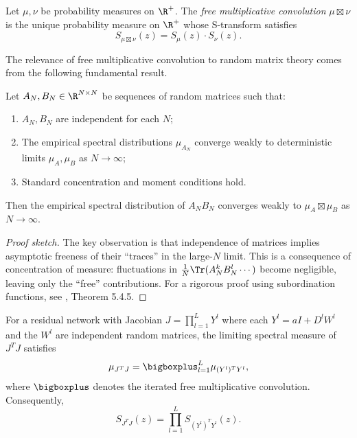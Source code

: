 \begin{definition}\label{def:free-multiplicative-convolution}
Let $\mu, \nu$ be probability measures on $\R^+$. The \emph{free multiplicative convolution} $\mu \boxtimes \nu$ is the unique probability measure on $\R^+$ whose S-transform satisfies
\begin{equation}
S_{\mu \boxtimes \nu}(z) = S_\mu(z) \cdot S_\nu(z).
\end{equation}
\end{definition}

The relevance of free multiplicative convolution to random matrix theory comes from the following fundamental result.

\begin{theorem}\label{thm:asymptotic-freeness}
Let $A_N, B_N \in \R^{N \times N}$ be sequences of random matrices such that:
\begin{enumerate}
\item $A_N, B_N$ are independent for each $N$;
\item The empirical spectral distributions $\mu_{A_N}$ converge weakly to deterministic limits $\mu_A, \mu_B$ as $N \to \infty$;
\item Standard concentration and moment conditions hold.
\end{enumerate}

Then the empirical spectral distribution of $A_N B_N$ converges weakly to $\mu_A \boxtimes \mu_B$ as $N \to \infty$.
\end{theorem}

\begin{proof}[Proof sketch]
The key observation is that independence of matrices implies asymptotic freeness of their ``traces'' in the large-$N$ limit. This is a consequence of concentration of measure: fluctuations in $\frac{1}{N}\Tr(A_N^k B_N^l \cdots)$ become negligible, leaving only the ``free'' contributions. For a rigorous proof using subordination functions, see \cite{anderson2010introduction}, Theorem 5.4.5.
\end{proof}

\begin{corollary}\label{cor:jacobian-free-convolution}
For a residual network with Jacobian $J = \prod_{l=1}^L Y^l$ where each $Y^l = aI + D^l W^l$ and the $W^l$ are independent random matrices, the limiting spectral measure of $J^T J$ satisfies
\begin{equation}\label{eq:jacobian-spectral}
\mu_{J^T J} = \bigboxplus_{l=1}^L \mu_{(Y^l)^T Y^l},
\end{equation}
where $\bigboxplus$ denotes the iterated free multiplicative convolution. Consequently,
\begin{equation}\label{eq:jacobian-s-transform}
S_{J^T J}(z) = \prod_{l=1}^L S_{(Y^l)^T Y^l}(z).
\end{equation}
\end{corollary}

